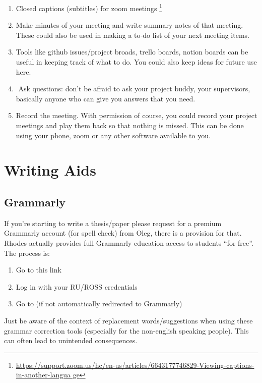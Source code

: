     \begin{enumerate}
        \item Closed captions (subtitles) for zoom meetings
        \footnote{\url{https://support.zoom.us/hc/en-us/articles/6643177746829-Viewing-captions-in-another-langua
        ge}}
        \item Make minutes of your meeting and write summary notes of that meeting. These could also be used in making a to-do list of your next meeting items.
        \item ​Tools like github issues/project broads, trello boards, notion boards can be useful in keeping track of what to do. You could also keep ideas for future use here.
        \item ​ Ask questions: don't be afraid to ask your project buddy, your supervisors, basically anyone who can give you answers that you need.
        \item Record the meeting. With permission of course, you could record your project meetings and play them back so that nothing is missed. This can be done using your phone, zoom or any other software available to you.
    \end{enumerate}



\section{Writing Aids}
\subsection{Grammarly}
    If you're starting to write a thesis/paper please request for a premium Grammarly account (for spell
    check) from Oleg, there is a provision for that. Rhodes actually provides full Grammarly education
    access to students “for free”. The process is:
    \begin{enumerate}
        \item  Go to this link 
        \item  Log in with your RU/ROSS credentials
        \item  Go to  (if not automatically redirected to Grammarly)
    \end{enumerate}

    Just be aware of the context of replacement words/suggestions when using these grammar correction tools (especially for the non-english speaking people). This can often lead to unintended consequences. 
    
